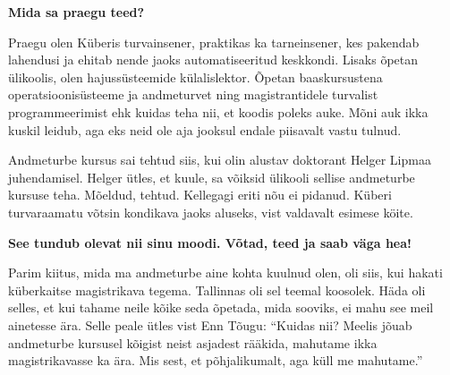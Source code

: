 \textbf{Mida sa praegu teed?}

Praegu olen Küberis turvainsener, praktikas ka
tarneinsener, kes pakendab lahendusi ja ehitab nende jaoks automatiseeritud
keskkondi. Lisaks õpetan ülikoolis, olen 
hajussüsteemide külalislektor. Õpetan baaskursustena operatsioonisüsteeme ja
andmeturvet ning magistrantidele turvalist programmeerimist ehk
kuidas teha nii, et koodis poleks auke. Mõni auk
ikka kuskil leidub, aga eks neid ole aja jooksul endale piisavalt vastu tulnud.

Andmeturbe kursus sai tehtud siis, kui olin alustav doktorant Helger
Lipmaa juhendamisel. Helger ütles, et kuule, sa 
võiksid ülikooli sellise andmeturbe kursuse teha. Mõeldud, tehtud.
Kellegagi eriti nõu ei pidanud. Küberi turvaraamatu võtsin kondikava jaoks aluseks,
vist valdavalt esimese köite.

\textbf{See tundub olevat nii sinu moodi. Võtad, teed ja saab väga
hea!}

Parim kiitus, mida ma andmeturbe aine kohta kuulnud olen, oli siis, kui hakati
küberkaitse magistrikava tegema. Tallinnas oli sel teemal koosolek. Häda oli
selles, et kui tahame neile kõike seda õpetada, mida sooviks, ei mahu see meil
ainetesse ära. Selle peale ütles vist Enn Tõugu:
\enquote{Kuidas nii? Meelis jõuab andmeturbe kursusel kõigist neist
asjadest rääkida, mahutame ikka magistrikavasse ka ära. Mis sest, et
põhjalikumalt, aga küll me mahutame.}

